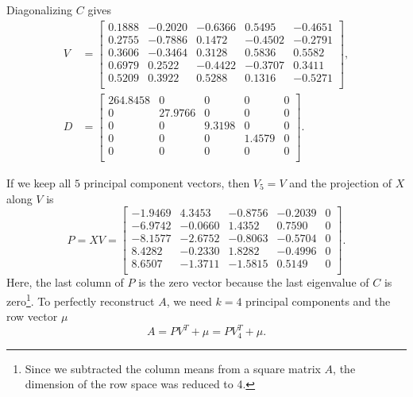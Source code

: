 \begin{example}
    Diagonalizing \(C\) gives
    \begin{align*}
        V &= \begin{bmatrix}
            0.1888 & -0.2020 & -0.6366 &  0.5495 & -0.4651\\
            0.2755 & -0.7886 &  0.1472 & -0.4502 & -0.2791\\
            0.3606 & -0.3464 &  0.3128 &  0.5836 &  0.5582\\
            0.6979 &  0.2522 & -0.4422 & -0.3707 &  0.3411\\
            0.5209 &  0.3922 &  0.5288 &  0.1316 & -0.5271\\
        \end{bmatrix},\\
        D &= \begin{bmatrix}
            264.8458 &       0 &      0 &      0 & 0 \\
                    0 & 27.9766 &      0 &      0 & 0 \\
                    0 &       0 & 9.3198 &      0 & 0 \\
                    0 &       0 &      0 & 1.4579 & 0 \\
                    0 &       0 &      0 &      0 & 0 \\
        \end{bmatrix}.
    \end{align*}
    
    If we keep all \(5\) principal component vectors, then \(V_5 = V\) and the projection of \(X\) along \(V\) is
    \[P = XV = \begin{bmatrix}
        -1.9469 &  4.3453 & -0.8756 & -0.2039 & 0 \\
        -6.9742 & -0.0660 &  1.4352 &  0.7590 & 0 \\
        -8.1577 & -2.6752 & -0.8063 & -0.5704 & 0 \\
            8.4282 & -0.2330 &  1.8282 & -0.4996 & 0 \\
            8.6507 & -1.3711 & -1.5815 &  0.5149 & 0 \\
    \end{bmatrix}.\]
    Here, the last column of \(P\) is the zero vector because the last eigenvalue of \(C\) is zero\footnote{Since we subtracted the column means from a square matrix \(A\), the dimension of the row space was reduced to 4.}.
    To perfectly reconstruct \(A\), we need \(k = 4\) principal components and the row vector \(\mu\)
    \[A = PV^T + \mu = PV_4^T + \mu.\]
    

\end{example}
